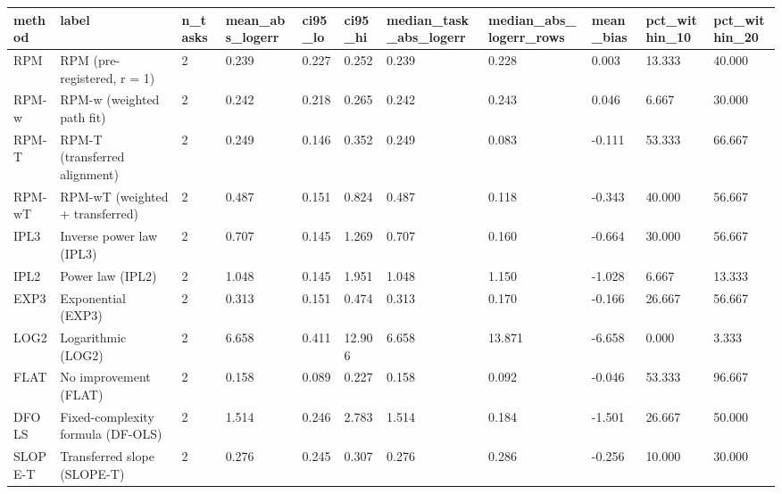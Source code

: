 \begin{tabular}{lllllllllll}
\hline
method & label & n\_tasks & mean\_abs\_logerr & ci95\_lo & ci95\_hi & median\_task\_abs\_logerr & median\_abs\_logerr\_rows & mean\_bias & pct\_within\_10 & pct\_within\_20 \\
\hline
RPM & RPM (pre-registered, r = 1) & 2 & 0.239 & 0.227 & 0.252 & 0.239 & 0.228 & 0.003 & 13.333 & 40.000 \\
RPM-w & RPM-w (weighted path fit) & 2 & 0.242 & 0.218 & 0.265 & 0.242 & 0.243 & 0.046 & 6.667 & 30.000 \\
RPM-T & RPM-T (transferred alignment) & 2 & 0.249 & 0.146 & 0.352 & 0.249 & 0.083 & -0.111 & 53.333 & 66.667 \\
RPM-wT & RPM-wT (weighted + transferred) & 2 & 0.487 & 0.151 & 0.824 & 0.487 & 0.118 & -0.343 & 40.000 & 56.667 \\
IPL3 & Inverse power law (IPL3) & 2 & 0.707 & 0.145 & 1.269 & 0.707 & 0.160 & -0.664 & 30.000 & 56.667 \\
IPL2 & Power law (IPL2) & 2 & 1.048 & 0.145 & 1.951 & 1.048 & 1.150 & -1.028 & 6.667 & 13.333 \\
EXP3 & Exponential (EXP3) & 2 & 0.313 & 0.151 & 0.474 & 0.313 & 0.170 & -0.166 & 26.667 & 56.667 \\
LOG2 & Logarithmic (LOG2) & 2 & 6.658 & 0.411 & 12.906 & 6.658 & 13.871 & -6.658 & 0.000 & 3.333 \\
FLAT & No improvement (FLAT) & 2 & 0.158 & 0.089 & 0.227 & 0.158 & 0.092 & -0.046 & 53.333 & 96.667 \\
DFOLS & Fixed-complexity formula (DF-OLS) & 2 & 1.514 & 0.246 & 2.783 & 1.514 & 0.184 & -1.501 & 26.667 & 50.000 \\
SLOPE-T & Transferred slope (SLOPE-T) & 2 & 0.276 & 0.245 & 0.307 & 0.276 & 0.286 & -0.256 & 10.000 & 30.000 \\
\hline
\end{tabular}
